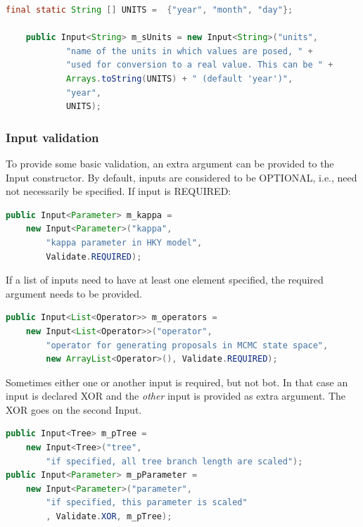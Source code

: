 \documentclass{article}
\begin{document}
{\color{blue}\begin{lstlisting}[language=java]
	final static String [] UNITS =  {"year", "month", "day"};
	
	public Input<String> m_sUnits = new Input<String>("units", 
            "name of the units in which values are posed, " +
			"used for conversion to a real value. This can be " + 
            Arrays.toString(UNITS) + " (default 'year')", 
            "year", 
            UNITS);
\end{lstlisting}}


\subsubsection{Input validation}

To provide some basic validation, an extra argument can be provided to the Input constructor.
By default, inputs are considered to be OPTIONAL, i.e., need not necessarily be specified.
If input is REQUIRED:

{\color{blue}\begin{lstlisting}[language=java]
public Input<Parameter> m_kappa = 
    new Input<Parameter>("kappa", 
        "kappa parameter in HKY model",
        Validate.REQUIRED);
\end{lstlisting}}

If a list of inputs need to have at least one element specified, the required
argument needs to be provided.

{\color{blue}\begin{lstlisting}[language=java]
public Input<List<Operator>> m_operators = 
    new Input<List<Operator>>("operator",
        "operator for generating proposals in MCMC state space",
        new ArrayList<Operator>(), Validate.REQUIRED);
\end{lstlisting}}

Sometimes either one or another input is required, but not bot. In that case
an input is declared XOR and the {\em other} input is provided as extra argument.
The XOR goes on the second Input.

{\color{blue}\begin{lstlisting}[language=java]
public Input<Tree> m_pTree = 
    new Input<Tree>("tree", 
        "if specified, all tree branch length are scaled");
public Input<Parameter> m_pParameter = 
    new Input<Parameter>("parameter", 
        "if specified, this parameter is scaled"
        , Validate.XOR, m_pTree);
\end{lstlisting}}
\end{document}
